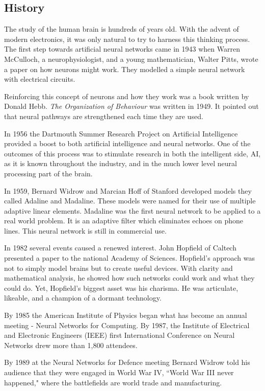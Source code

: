 \documentclass[12pt, a4paper, twoside]{report}
\begin{document}
\subsection{History}
The study of the human brain is hundreds of years old. With the advent of modern electronics, it was only natural to try to harness this thinking process. The first step towards artificial neural networks came in 1943 when Warren McCulloch, a neurophysiologist, and a young mathematician, Walter Pitts, wrote a paper on how neurons might work. They modelled a simple neural network with electrical circuits.
\par
Reinforcing this concept of neurons and how they work was a book written by Donald Hebb. {\itshape The Organization of Behaviour} was written in 1949. It pointed out that neural pathways are strengthened each time they are used.
\par
In 1956 the Dartmouth Summer Research Project on Artificial Intelligence provided a boost to both artificial intelligence and neural networks. One of the outcomes of this process was to stimulate research in both the intelligent side, AI, as it is known throughout the industry, and in the much lower level neural processing part of the brain.
\par
In 1959, Bernard Widrow and Marcian Hoff of Stanford developed models they called Adaline and Madaline. These models were named for their use of multiple adaptive linear elements. Madaline was the first neural network to be applied to a real world problem. It is an adaptive filter which eliminates echoes on phone lines. This neural network is still in commercial use.
\par
In 1982 several events caused a renewed interest. John Hopfield of Caltech presented a paper to the national Academy of Sciences. Hopfield's approach was not to simply model brains but to create useful devices. With clarity and mathematical analysis, he showed how such networks could work and what they could do. Yet, Hopfield's biggest asset was his charisma. He was articulate, likeable, and a champion of a dormant technology.
\par
By 1985 the American Institute of Physics began what has become an annual meeting - Neural Networks for Computing. By 1987, the Institute of Electrical and Electronic Engineers (IEEE) first International Conference on Neural Networks drew more than 1,800 attendees.
\par
By 1989 at the Neural Networks for Defence meeting Bernard Widrow told his audience that they were engaged in World War IV, ``World War III never happened," where the battlefields are world trade and manufacturing.
\end{document}
